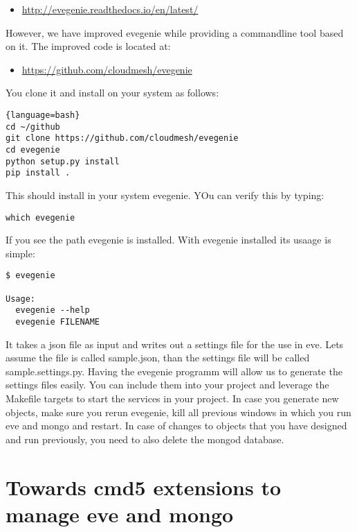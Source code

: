 \begin{itemize}
\item
 \url{http://evegenie.readthedocs.io/en/latest/}
\end{itemize}

However, we have improved evegenie while providing a commandline tool
based on it. The improved code is located at:

\begin{itemize}
\tightlist
\item
 \url{https://github.com/cloudmesh/evegenie}
\end{itemize}

You clone it and install on your system as follows:

\begin{lstlisting}{language=bash}
cd ~/github
git clone https://github.com/cloudmesh/evegenie
cd evegenie
python setup.py install
pip install .
\end{lstlisting}

This should install in your system evegenie. YOu can verify this by
typing:

\begin{lstlisting}
which evegenie
\end{lstlisting}

If you see the path evegenie is installed. With evegenie installed its
usaage is simple:

\begin{lstlisting}
$ evegenie

Usage:
  evegenie --help
  evegenie FILENAME
\end{lstlisting}

It takes a json file as input and writes out a settings file for the use
in eve. Lets assume the file is called sample.json, than the settings
file will be called sample.settings.py. Having the evegenie programm
will allow us to generate the settings files easily. You can include
them into your project and leverage the Makefile targets to start the
services in your project. In case you generate new objects, make sure
you rerun evegenie, kill all previous windows in which you run eve and
mongo and restart. In case of changes to objects that you have designed
and run previously, you need to also delete the mongod database.

\section{Towards cmd5 extensions to manage eve and
mongo}\label{towards-cmd5-extensions-to-manage-eve-and-mongo}


